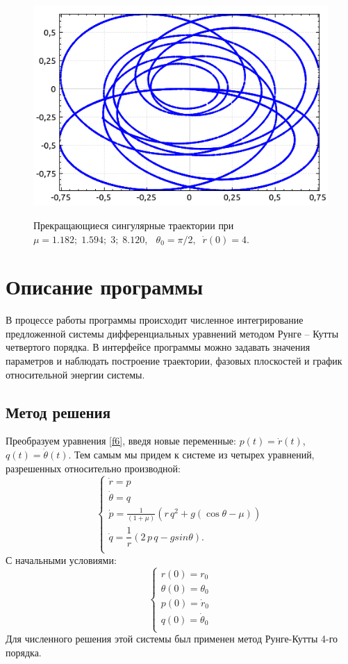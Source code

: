 \documentclass[12pt]{article}
\numberwithin{equation}{section}
\begin{document}
\begin{enumerate}
\begin{figure}[h]
{			\includegraphics[scale=0.5]{8.13_1.5708}
		}
		\caption{Прекращающиеся сингулярные траектории при ${\mu=1.182;\;1.594;\;3;\;8.120}$, $\;\;\theta_{0}=\pi/2, \;\; \dot r(0) = 4.$}
        \label{terminating}
	\end{figure}	
\end{enumerate}
\section{Описание программы}

В процессе работы программы происходит численное интегрирование предложенной системы дифференциальных уравнений методом Рунге -- Кутты четвертого порядка. В интерфейсе программы можно задавать значения параметров и наблюдать построение траектории, фазовых плоскостей и график относительной энергии системы.
\subsection{Метод решения}
Преобразуем уравнения \ref{f6}, введя новые переменные: $ p(t)=\dot r(t) $, $ q(t)=\dot \theta(t)$. Тем самым мы придем к системе из четырех уравнений, разрешенных относительно производной: 
\begin{equation}\label{fk}
\begin{cases}
\dot r = p\\
\dot \theta = q\\
\dot{p} =\frac{1}{(1+\mu)}( r \,q^{2}+g( \cos\theta - \mu))\\
\dot q=\dfrac{1}{r}(2\,p\,q-g sin\theta).\\
\end{cases}
\end{equation}
С начальными условиями:
\begin{equation}\label{fn}
\begin{cases}
r(0)=r_{0}\\
\theta(0)=\theta_{0}\\
p(0)=\dot r_{0}\\
q(0)=\dot \theta_{0}\\
\end{cases}
\end{equation}
Для численного решения этой системы был применен метод Рунге-Кутты 4-го порядка.
\end{document}
